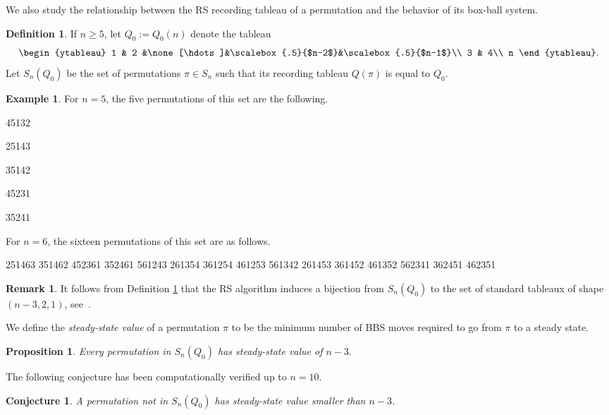 \documentclass[submission]{FPSAC2021}
\theoremstyle{plain}
\newtheorem{conjecture}[theorem]{Conjecture}
\newtheorem{proposition}[theorem]{Proposition}
\theoremstyle{definition}
\newtheorem{definition}[theorem]{Definition}
\newtheorem{example}[theorem]{Example}
\newtheorem{remark}[theorem]{Remark}
\numberwithin{equation}{section}
\begin{document}
We also study the relationship between the RS recording tableau of a permutation and the behavior of its box-ball system.

\begin{definition}\label{def: Q_0}
If $n \geq 5$, let $Q_0:=Q_0(n)$ denote the tableau $$\begin{ytableau}
 1 & 2 &\none[\hdots]&\scalebox{.5}{$n-2$}&\scalebox{.5}{$n-1$}\\
 3 & 4\\
 n
 \end{ytableau}.$$
Let $S_n(Q_0)$ be the set of permutations $\pi \in S_n$ such that its recording tableau $Q(\pi)$ is equal to $Q_0$.
\end{definition}


\begin{example}
For $n=5$, the five permutations of this set are the following.
\begin{multicols}{5}
 45132
 
 25143
 
 35142
 
 45231
 
 35241
\end{multicols}
For $n=6$, the sixteen permutations of this set are as follows.
\begin{multicols}{8}
251463
351462
452361
352461
561243
261354
361254
461253
561342
261453
361452
461352
562341
362451
462351
\end{multicols}
\end{example}

 \begin{remark}
It follows from Definition \ref{def: Q_0} that the RS algorithm induces a bijection from $S_n(Q_0)$ to the set of standard tableaux of shape $(n-3,2,1)$, see~\cite{Lang02OEIS}.
 \end{remark}

We define the \emph{steady-state value} of a permutation $\pi$ to be the minimum number of BBS moves required to go from $\pi$ to a steady state. 

\begin{proposition}
    Every permutation in $S_n(Q_0)$ has steady-state value of $n-3.$
\end{proposition}
The following conjecture has been computationally verified up to $n=10.$
\begin{conjecture}
     A permutation not in $S_n(Q_0)$ has steady-state value smaller than $n-3$.
\end{conjecture}
\end{document}
